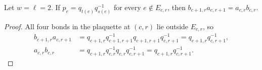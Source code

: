 \begin{lemma}%
    \label{thm:peps_labelled_uncut_flat}
    \leanok
    Let $w=\ell=2$. If $p_e=q_{t(e)}q_{s(e)}^{-1}$ for every $e\notin E_{c,r}$, then $b_{c+1,r}a_{c,r+1}=a_{c,r}b_{c,r}$.
\end{lemma}
\begin{proof}\leanok
    All four bonds in the plaquette at $(c,r)$ lie outside $E_{c,r}$, so
    \begin{align}
        b_{c+1,r}a_{c,r+1}
         & =q_{c+1,r}q_{c+1,r+1}^{-1}
        q_{c+1,r+1}q_{c,r+1}^{-1}
        =q_{c+1,r}q_{c,r+1}^{-1},\nonumber             \\
        a_{c,r}b_{c,r}
         & =q_{c+1,r}q_{c,r}^{-1}q_{c,r}q_{c,r+1}^{-1}
        =q_{c+1,r}q_{c,r+1}^{-1}.
        \label{eq:peps_labelled_uncut_flat}
    \end{align}
\end{proof}
